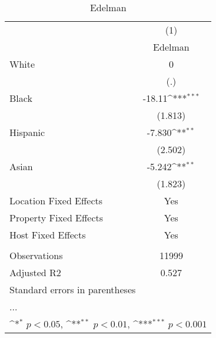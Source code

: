 \begin{table}[htbp]\centering
\def\sym#1{\ifmmode^{#1}\else\(^{#1}\)\fi}
\caption{Edelman}
\begin{tabular}{l*{1}{c}}
\hline\hline
                    &\multicolumn{1}{c}{(1)}\\
                    &\multicolumn{1}{c}{Edelman}\\
\hline
White               &           0         \\
                    &         (.)         \\
[1em]
Black               &      -18.11\sym{***}\\
                    &     (1.813)         \\
[1em]
Hispanic            &      -7.830\sym{**} \\
                    &     (2.502)         \\
[1em]
Asian               &      -5.242\sym{**} \\
                    &     (1.823)         \\
\hline
Location Fixed Effects&         Yes         \\
Property Fixed Effects&         Yes         \\
Host Fixed Effects  &         Yes         \\
\hline \vspace{-1.25em}&                     \\
Observations        &       11999         \\
Adjusted R2         &       0.527         \\
\hline\hline
\multicolumn{2}{l}{\footnotesize Standard errors in parentheses}\\
\multicolumn{2}{l}{\footnotesize ...}\\
\multicolumn{2}{l}{\footnotesize \sym{*} \(p<0.05\), \sym{**} \(p<0.01\), \sym{***} \(p<0.001\)}\\
\end{tabular}
\end{table}

